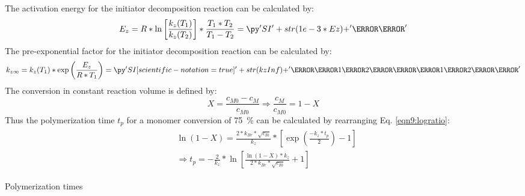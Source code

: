 \begin{solution}
\begin{equation}
\end{equation}
The activation energy for the initiator decomposition reaction can be calculated by:
\begin{equation}
 E_{z} = R * \ln\left[\frac{k_{z}(T_1)}{k_{z}(T_2)}\right] * \frac{T_1 * T_2}{T_1 - T_2} = \pySI{1e-3 * Ez}{\kilo\joule}
\end{equation}
The pre-exponential factor for the initiator decomposition reaction  can be calculated by:
\begin{equation}
 k_{z\infty} = k_{z}(T_1) * \exp\left(\frac{E_{z}}{R * T_1}\right) = \pySIsci{kzInf}{\liter \pow{1\per 2} \per \mole \pow{1\per 2} \per \second}
\end{equation}
The conversion in constant reaction volume is defined by:
%
\begin{equation}
X = \frac{c_{M0} - c_M}{c_{M0}} \Longrightarrow \frac{c_M}{c_{M0}} = 1 - X
\end{equation}
%
Thus the polymerization time $t_p$ for a monomer conversion of \SI{75}{\percent} can be calculated by rearranging Eq. \ref{eqn9:logratio}:
%
\begin{align}
\begin{split}
&\ln \left( 1 - X \right) = \frac{2 * k_{Br} * \sqrt{c_{I0}}}{k_z} * \left[ \exp\left(\frac{-k_z * t_p}{2} \right) - 1 \right]\\
&\Longrightarrow t_p = -\frac{2}{k_z} * \ln \left[ \frac{\ln (1 - X) * k_z}{2 * k_{Br} * \sqrt{c_{I0}}} + 1 \right]
\end{split} 
\end{align}
\begin{table}[H]
\centering
\caption{Polymerization times}
\end{table}
\end{solution}



